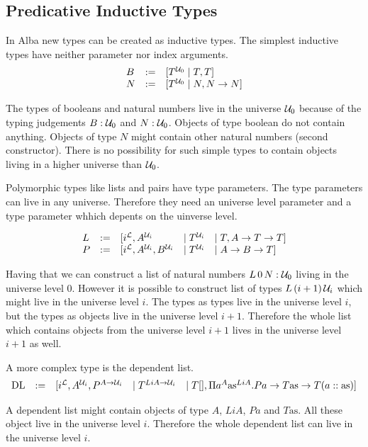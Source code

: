 \subsection{Predicative Inductive Types}

In Alba new types can be created as inductive types. The simplest inductive
types have neither parameter nor index arguments.
$$
\begin{array}{lll}
    B &:=& [T^{{\cal U}_0} \mid T, T]
    \\
    N &:=& [T^{{\cal U}_0} \mid N, N \to N]
\end{array}
$$

The types of booleans and natural numbers live in the universe ${\cal U}_0$ because
of the typing judgements $B: {\cal U}_0$ and $N: {\cal U}_0$. Objects of type boolean do
not contain anything. Objects of type $N$ might contain other natural numbers
(second constructor). There is no possibility for such simple types to contain
objects living in a higher universe than ${\cal U}_0$.

Polymorphic types like lists and pairs have type parameters. The type parameters
can live in any universe. Therefore they need an universe level parameter and a
type parameter whhich depents on the uinverse level.

$$
\begin{array}{lllll}
    L &:=& [i^{\cal L}, A^{{\cal U}_i} &\mid T^{{\cal U}_i} &\mid T, A \to T \to T]
    \\
    P &:=& [i^{\cal L}, A^{{\cal U}_i}, B^{{\cal U}_i} &\mid T^{{\cal U}_i} &\mid A \to B \to T]
\end{array}
$$

Having that we can construct a list of natural numbers $L\,0\,N: {\cal U}_0$ living
in the universe level $0$. However it is possible to construct list of types
$L\,(i+1)\,{\cal U}_i$ which might live in the universe level $i$. The types as
types live in the universe level $i$, but the types as objects live in the
universe level $i+1$. Therefore the whole list which contains objects from the
universe level $i + 1$ lives in the universe level $i+1$ as well.


A more complex type is the dependent list.
$$
\begin{array}{lllll}
    \text{DL} &:=&
    [
        i^{\cal L}, A^{{\cal U}_i}, P^{A \to {\cal U}_i}
        &\mid
        T^{LiA \to {\cal U}_i}
        &\mid
        T[],
        \Pi a^A \text{as}^{LiA}.
            Pa \to T\text{as} \to T(a :: \text{as})
    ]
\end{array}
$$

A dependent list might contain objects of type $A$, $LiA$, $Pa$ and
$T\text{as}$. All these object live in the universe level $i$. Therefore the
whole dependent list can live in the universe level $i$.

